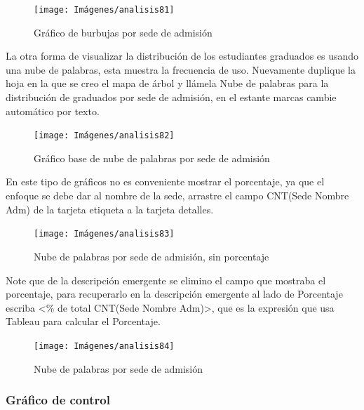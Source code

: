 \documentclass[
]{book}
\begin{document}
\begin{figure}

{\centering \texttt{[image: Imágenes/analisis81]} 

}

\caption{Gráfico de burbujas por sede de admisión}\label{fig:burbujas-fig}
\end{figure}

La otra forma de visualizar la distribución de los estudiantes graduados es usando una nube de palabras, esta muestra la frecuencia de uso. Nuevamente duplique la hoja en la que se creo el mapa de árbol y llámela Nube de palabras para la distribución de graduados por sede de admisión, en el estante marcas cambie automático por texto.

\begin{figure}

{\centering \texttt{[image: Imágenes/analisis82]} 

}

\caption{Gráfico base de nube de palabras por sede de admisión}\label{fig:nubepalabras-fig}
\end{figure}

En este tipo de gráficos no es conveniente mostrar el porcentaje, ya que el enfoque se debe dar al nombre de la sede, arrastre el campo CNT(Sede Nombre Adm) de la tarjeta etiqueta a la tarjeta detalles.

\begin{figure}

{\centering \texttt{[image: Imágenes/analisis83]} 

}

\caption{Nube de palabras por sede de admisión, sin porcentaje}\label{fig:nubepalabraseditada-fig}
\end{figure}

Note que de la descripción emergente se elimino el campo que mostraba el porcentaje, para recuperarlo en la descripción emergente al lado de Porcentaje escriba \textless\% de total CNT(Sede Nombre Adm)\textgreater, que es la expresión que usa Tableau para calcular el Porcentaje.

\begin{figure}

{\centering \texttt{[image: Imágenes/analisis84]} 

}

\caption{Nube de palabras por sede de admisión}\label{fig:nubepalabrasfinal-fig}
\end{figure}

\hypertarget{graficodecontrol}{%
\subsubsection{Gráfico de control}\label{graficodecontrol}}
\end{document}
